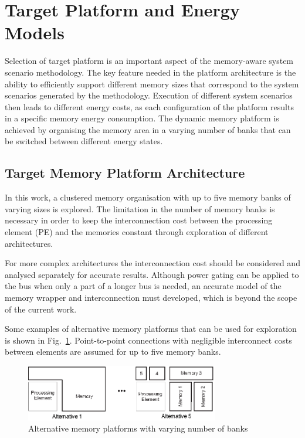 \documentclass[smallcondensed]{svjour3}
\begin{document}
\section{Target Platform and Energy Models}
\label{sec:platform}

Selection of target platform is an important aspect of the memory-aware system scenario methodology. 
The key feature needed in the platform architecture is the ability to efficiently support different memory sizes that correspond to the system scenarios generated by the methodology. 
Execution of different system scenarios then leads to different energy costs, as each configuration of the platform results in a specific memory energy consumption. 
The dynamic memory platform is achieved by organising the memory area in a varying number of banks that can be switched between different energy states. 

\subsection{Target Memory Platform Architecture}

In this work, a clustered memory organisation with up to five memory banks of varying sizes is explored. 
The limitation in the number of memory banks is necessary in order to keep the interconnection cost between the processing element (PE) and the memories constant through exploration of different architectures. 

For more complex architectures the interconnection cost should be considered and analysed separately for accurate results. 
Although power gating can be applied to the bus when only a part of a longer bus is needed, an accurate model of the memory wrapper and interconnection must developed, which is beyond the scope of the current work. 

Some examples of alternative memory platforms that can be used for exploration is shown in Fig.~\ref{fig:platform}. 
Point-to-point connections with negligible interconnect costs between elements are assumed for up to five memory banks.

\begin{figure}
\centering
\includegraphics[width=0.75\textwidth]{Images/platform.eps}
\caption{Alternative memory platforms with varying number of banks}
\label{fig:platform}
\end{figure}
\end{document}
